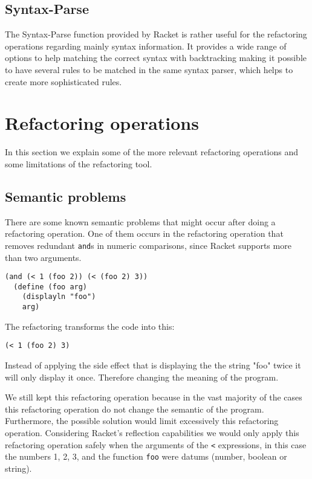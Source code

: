 \subsection{Syntax-Parse}

The Syntax-Parse\cite{tobin2011languages} function provided by Racket is rather useful for the refactoring
operations regarding mainly syntax information.
It provides a wide range of options to help matching the correct syntax with  %
backtracking making it possible to have several rules to be matched
in the same syntax parser, which helps to create more sophisticated rules.

\section{Refactoring operations}
In this section we explain some of the  more relevant refactoring operations and
some limitations of the refactoring tool.

\subsection{Semantic problems}
There are some known semantic problems that might occur after doing a refactoring
operation.
One of them occurs in the refactoring operation that removes redundant {\tt and}s
in numeric comparisons, since Racket supports more than two arguments.
\begin{lstlisting}[basicstyle=\ttfamily, caption=And example]
  (and (< 1 (foo 2)) (< (foo 2) 3))
  (define (foo arg)
    (displayln "foo")
    arg)
\end{lstlisting}
The refactoring transforms the code into this:
\begin{lstlisting}[basicstyle=\ttfamily, caption=Refactored code]
  (< 1 (foo 2) 3)
\end{lstlisting}


Instead of applying the side effect that is displaying the the string "foo"
 twice it will only display it once. Therefore changing the meaning of the program.

We still kept this refactoring operation because in the vast majority
of the cases this refactoring operation do not change the semantic of the program.
Furthermore, the possible solution would limit excessively this refactoring operation.  %
Considering Racket's reflection capabilities we would only apply this refactoring operation
safely when the arguments of the {\tt <} expressions, in this case the numbers 1, 2, 3, and the function {\tt foo}
 were datums (number, boolean or string).


